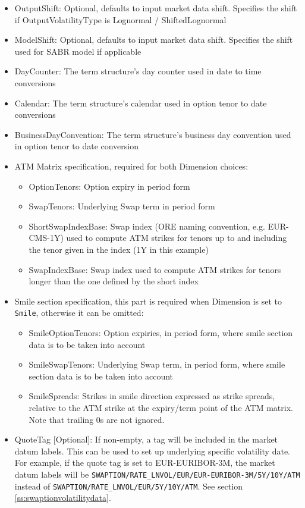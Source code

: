 \begin{itemize}
  and shift is handled by the calibrated parametric model. An early conversion of the input market data would not be an
  advantage in this case, we could only loose information.
\item OutputShift: Optional, defaults to input market data shift. Specifies the shift if OutputVolatilityType is
  Lognormal / ShiftedLognormal
\item ModelShift: Optional, defaults to input market data shift. Specifies the shift used for SABR model if applicable
\item DayCounter: The term structure's day counter used in date to time conversions
\item Calendar: The term structure's calendar used in option tenor to date conversions
\item BusinessDayConvention: The term structure's business day convention used in option tenor to date conversion
\item ATM Matrix specification, required for both Dimension choices:
  \begin{itemize}
  \item OptionTenors: Option expiry in period form
  \item SwapTenors: Underlying Swap term in period form
  \item ShortSwapIndexBase: Swap index (ORE naming convention, e.g. EUR-CMS-1Y) used to compute ATM strikes for tenors up to and including the tenor given in the index (1Y in this example)
  \item SwapIndexBase: Swap index used to compute ATM strikes for tenors longer than the one defined by the short index
  \end{itemize}
\item Smile section specification, this part is required when Dimension is set to {\tt Smile}, otherwise it can be omitted:
  \begin{itemize}
  \item SmileOptionTenors: Option expiries, in period form, where smile section data is to be taken into account
  \item SmileSwapTenors: Underlying Swap term, in period form, where smile section data is to be taken into account
  \item SmileSpreads: Strikes in smile direction expressed as strike spreads, relative to the ATM strike at the expiry/term point of the ATM matrix. Note that trailing 0s are not ignored.
  \end{itemize}
\item QuoteTag [Optional]: If non-empty, a tag will be included in the market datum labels. This can be used to set up
  underlying specific volatility date. For example, if the quote tag is set to EUR-EURIBOR-3M, the market datum labels
  will be \verb+SWAPTION/RATE_LNVOL/EUR/EUR-EURIBOR-3M/5Y/10Y/ATM+ instead of
  \verb+SWAPTION/RATE_LNVOL/EUR/5Y/10Y/ATM+. See section \ref{ss:swaptionvolatilitydata}.
\end{itemize}

